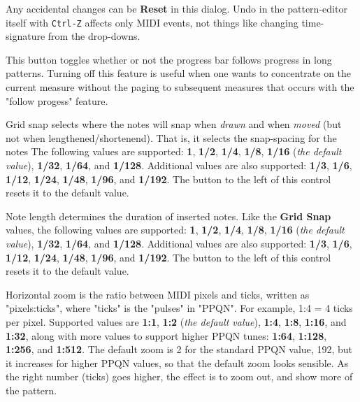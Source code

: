    Any accidental changes can be \textbf{Reset}
   in this dialog.
   Undo in the pattern-editor itself with \texttt{Ctrl-Z} affects
   only MIDI events, not things like changing time-signature from the
   drop-downs.

   This button toggles whether or not the progress bar follows
   progress in long patterns.  Turning off this feature is useful when
   one wants to concentrate on the current measure without the paging to
   subsequent measures that occurs with the "follow progess" feature.

   Grid snap selects where the notes will snap when
   \textsl{drawn} and when \textsl{moved} (but not when lengthened/shortenend).
   That is, it selects the snap-spacing for the notes
   The following values are supported:
   \textbf{1}, \textbf{1/2}, \textbf{1/4}, \textbf{1/8},
   \textbf{1/16} (\textsl{the default value}),
   \textbf{1/32}, \textbf{1/64}, and \textbf{1/128}.
   Additional values are also supported:
   \textbf{1/3}, \textbf{1/6}, \textbf{1/12}, \textbf{1/24},
   \textbf{1/48}, \textbf{1/96}, and \textbf{1/192}.
   The button to the left of this control resets it to the default value.

   Note length determines the duration of inserted notes.
   Like the \textbf{Grid Snap} values,
   the following values are supported:
   \textbf{1}, \textbf{1/2}, \textbf{1/4}, \textbf{1/8},
   \textbf{1/16} (\textsl{the default value}),
   \textbf{1/32}, \textbf{1/64}, and \textbf{1/128}.
   Additional values are also supported:
   \textbf{1/3}, \textbf{1/6}, \textbf{1/12}, \textbf{1/24},
   \textbf{1/48}, \textbf{1/96}, and \textbf{1/192}.
   The button to the left of this control resets it to the default value.

   Horizontal zoom is the ratio between MIDI pixels and ticks, written as
   "pixels:ticks", where "ticks" is the "pulses" in "PPQN".
   For example, 1:4 = 4 ticks per pixel.
   Supported values are
   \textbf{1:1}, \textbf{1:2} (\textsl{the default value}),
   \textbf{1:4}, \textbf{1:8}, \textbf{1:16},
   and \textbf{1:32}, along with
   more values to support higher PPQN tunes:
   \textbf{1:64}, \textbf{1:128}, \textbf{1:256}, and \textbf{1:512}.
   The default zoom is 2 for the standard PPQN value, 192, but it
   increases for higher PPQN values, so that the default zoom looks sensible.
   As the right number (ticks) goes higher,
   the effect is to zoom out, and show more of the pattern.

